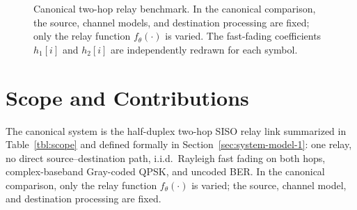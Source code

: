 \begin{figure}[htbp]
\caption[Canonical two-hop relay benchmark]{Canonical two-hop relay benchmark. In the canonical comparison, the source, channel models, and destination processing are fixed; only the relay function $f_\theta(\cdot)$ is varied. The fast-fading coefficients $h_1[i]$ and $h_2[i]$ are independently redrawn for each symbol.}
\label{fig:canonical-relay-benchmark}
\end{figure}

\section{Scope and Contributions}\label{sec:system-model-intro}

The canonical system is the half-duplex two-hop SISO relay link summarized in Table~\ref{tbl:scope} and defined formally in Section~\ref{sec:system-model-1}: one relay, no direct source--destination path, i.i.d.\ Rayleigh fast fading on both hops, complex-baseband Gray-coded QPSK, and uncoded BER. In the canonical comparison, only the relay function $f_\theta(\cdot)$ is varied; the source, channel model, and destination processing are fixed.

